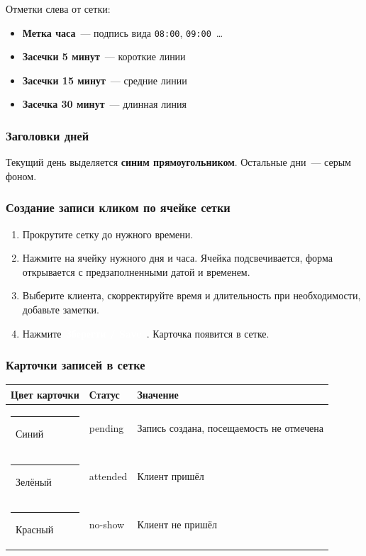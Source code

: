 \documentclass[12pt,a4paper]{article}
\newcommand{\btn}[2][primary]{%
  \textcolor{white}{\colorbox{#1}{\small\bfseries\,#2\,}}%
}
\begin{document}
Отметки слева от сетки:
\begin{itemize}
  \item \textbf{Метка часа}~--- подпись вида \texttt{08:00}, \texttt{09:00}~\ldots
  \item \textbf{Засечки 5 минут}~--- короткие линии
  \item \textbf{Засечки 15 минут}~--- средние линии
  \item \textbf{Засечка 30 минут}~--- длинная линия
\end{itemize}

\subsubsection{Заголовки дней}

Текущий день выделяется \textbf{синим прямоугольником}.
Остальные дни~--- серым фоном.

\subsubsection{Создание записи кликом по ячейке сетки}

\begin{enumerate}
  \item Прокрутите сетку до нужного времени.
  \item Нажмите на ячейку нужного дня и часа.
    Ячейка подсвечивается, форма открывается с предзаполненными
    датой и временем.
  \item Выберите клиента, скорректируйте время и длительность при
    необходимости, добавьте заметки.
  \item Нажмите \btn{Зберегти / Save}. Карточка появится в сетке.
\end{enumerate}

\subsubsection{Карточки записей в сетке}

\begin{center}
\begin{tabular}{llp{7cm}}
  \toprule
  Цвет карточки & Статус & Значение \\
  \midrule
  \textcolor{primary}{\rule{12pt}{12pt}}~Синий &
    pending & Запись создана, посещаемость не отмечена \\[2pt]
  \textcolor{success!70!black}{\rule{12pt}{12pt}}~Зелёный &
    attended & Клиент пришёл \\[2pt]
  \textcolor{danger}{\rule{12pt}{12pt}}~Красный &
    no-show & Клиент не пришёл \\
  \bottomrule
\end{tabular}
\end{center}
\end{document}
